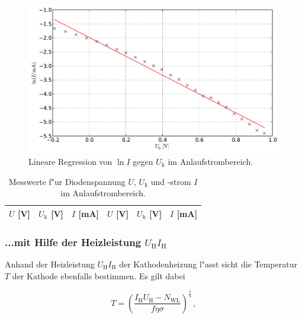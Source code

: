 			\begin{figure}[h!]
				\centering
				\includegraphics[width = 15cm]{img/messung2.pdf}
				\caption{Lineare Regression von $\ln{I}$ gegen $U_\mathrm{k}$ im Anlaufstrombereich.}
				\label{fig:messung2}
			\end{figure}

			\begin{table}[h!]
				\begin{center}
					\label{messung1}
					\caption{Messwerte f"ur Diodenspannung $U$, $U_\mathrm{k}$ und -strom $I$ im Anlaufstrombereich.}
					\begin{tabular}{|r|r|r||r|r|r|}
						\hline
							$U$ [V] & $U_\mathrm{k}$ [V] & $I$ [mA] & $U$ [V] & $U_\mathrm{k}$ [V] & $I$ [mA] \\
						\hline 
						\hline
							
						\hline 
					\end{tabular}
				\end{center}
			\end{table}

			\clearpage

		\subsubsection{...mit Hilfe der Heizleistung $U_\mathrm{H}I_\mathrm{H}$}
			\label{subsubsec:temp2}
			Anhand der Heizleistung $U_\mathrm{H}I_\mathrm{H}$ der Kathodenheizung l"asst sicht die Temperatur $T$ der Kathode ebenfalls bestimmen.
			Es gilt dabei

			\begin{equation*}
				T = \left(\frac{I_\mathrm{H}U_\mathrm{H} - N_\mathrm{WL}}{f \eta \sigma}\right)^{\frac{1}{4}}\,,
			\end{equation*}

